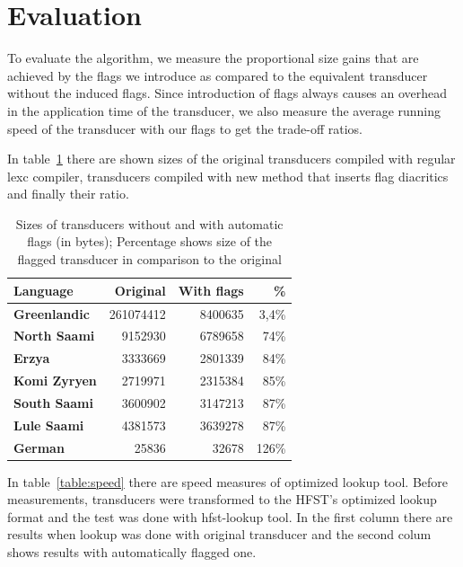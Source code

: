 \documentclass[11pt]{article}
\begin{document}
\section{Evaluation}
\label{sec:evaluation}

To evaluate the algorithm, we measure the proportional size gains that are
achieved by the flags we introduce as compared to the equivalent transducer
without the induced flags. Since introduction of flags always causes an overhead in the
application time of the transducer, we also measure the average running speed
of the transducer with our flags to get the trade-off ratios.

In table~\ref{table:sizes} there are shown sizes of the original transducers compiled with regular lexc compiler, transducers compiled with new method that inserts flag diacritics and finally their ratio.

\begin{table}
    \centering
    \begin{tabular}{|l|r|r|r|}
        \hline
        \bf Language & \bf Original & \bf With flags & \bf \% \\
        \hline
        \bf Greenlandic &	261074412 	& 8400635 & 3,4\%  \\
        \bf North Saami &	9152930 	& 6789658 & 74\%  \\
        \bf Erzya		&	3333669 	& 2801339 & 84\%  \\
        \bf Komi Zyryen &	2719971 	& 2315384 & 85\%  \\
        \bf South Saami &	3600902 	& 3147213 & 87\%  \\
        \bf Lule Saami 	&	4381573 	& 3639278 & 87\%  \\
        \bf German 		&	25836 		& 32678   & 126\%  \\
        \hline
    \end{tabular}
    \caption{Sizes of transducers without and with automatic flags (in bytes); Percentage shows size of the flagged transducer in comparison to the original
    \label{table:sizes}}
\end{table}

In table~\ref{table:speed} there are speed measures of optimized lookup tool. Before measurements, transducers were transformed to the HFST's optimized lookup format and the test was done with hfst-lookup tool. In the first column there are results when lookup was done with original transducer and the second colum shows results with automatically flagged one. 
\end{document}
